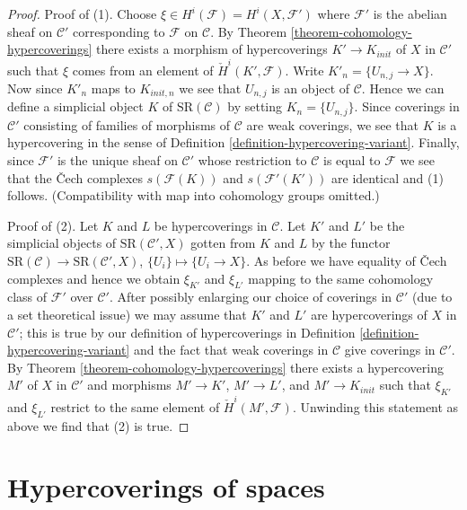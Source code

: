 \documentclass[10pt,a4paper]{article}
\theoremstyle{plain}
\theoremstyle{definition}
\theoremstyle{remark}
\numberwithin{equation}{subsection}
\begin{document}
\begin{proof}
\medskip\noindent
Proof of (1). Choose $\xi \in H^i(\mathcal{F}) = H^i(X, \mathcal{F}')$
where $\mathcal{F}'$ is the abelian sheaf on $\mathcal{C}'$ corresponding
to $\mathcal{F}$ on $\mathcal{C}$. By
Theorem \ref{theorem-cohomology-hypercoverings}
there exists a morphism of hypercoverings $K' \to K_{init}$
of $X$ in $\mathcal{C}'$ such that $\xi$ comes from an element
of $\check{H}^i(K', \mathcal{F})$.
Write $K'_n = \{U_{n, j} \to X\}$. Now since $K'_n$ maps to
$K_{init, n}$ we see that $U_{n, j}$ is an object of $\mathcal{C}$.
Hence we can define a simplicial object $K$ of $\text{SR}(\mathcal{C})$
by setting $K_n = \{U_{n, j}\}$. Since coverings in
$\mathcal{C}'$ consisting of families of morphisms of $\mathcal{C}$
are weak coverings, we see that $K$ is a hypercovering in the sense
of Definition \ref{definition-hypercovering-variant}.
Finally, since $\mathcal{F}'$ is the unique sheaf on $\mathcal{C}'$
whose restriction to $\mathcal{C}$ is equal to $\mathcal{F}$
we see that the {\v C}ech complexes $s(\mathcal{F}(K))$
and $s(\mathcal{F}'(K'))$ are identical and (1) follows.
(Compatibility with map into cohomology groups omitted.)

\medskip\noindent
Proof of (2). Let $K$ and $L$ be hypercoverings in $\mathcal{C}$.
Let $K'$ and $L'$ be the simplicial objects of $\text{SR}(\mathcal{C}', X)$
gotten from $K$ and $L$ by the functor
$\text{SR}(\mathcal{C}) \to \text{SR}(\mathcal{C}', X)$,
$\{U_i\} \mapsto \{U_i \to X\}$. As before we have equality of
{\v C}ech complexes and hence we obtain $\xi_{K'}$ and
$\xi_{L'}$ mapping to the same cohomology class of $\mathcal{F}'$
over $\mathcal{C}'$. After possibly enlarging our choice
of coverings in $\mathcal{C}'$ (due to a set theoretical issue)
we may assume that $K'$ and $L'$ are hypercoverings of $X$ in
$\mathcal{C}'$; this is true by our definition of hypercoverings in
Definition \ref{definition-hypercovering-variant} and
the fact that weak coverings in $\mathcal{C}$ give coverings in
$\mathcal{C}'$. By
Theorem \ref{theorem-cohomology-hypercoverings}
there exists a hypercovering $M'$ of $X$ in $\mathcal{C}'$
and morphisms $M' \to K'$, $M' \to L'$, and $M' \to K_{init}$
such that $\xi_{K'}$ and $\xi_{L'}$ restrict to the same element of
$\check{H}^i(M', \mathcal{F})$. Unwinding this statement as above
we find that (2) is true.
\end{proof}





\section{Hypercoverings of spaces}
\label{section-hypercoverings-spaces}
\end{document}
